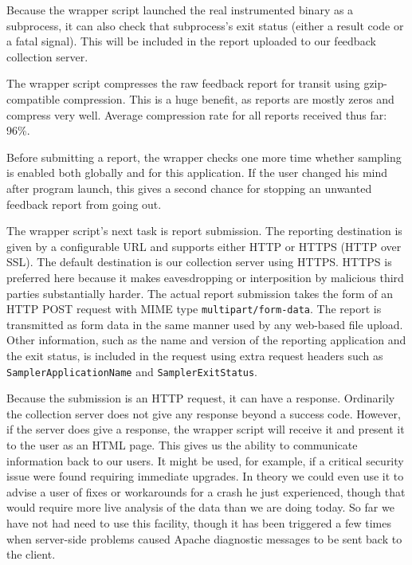 \documentclass[times,10pt,twocolumn]{article}
\begin{document}
Because the wrapper script launched the real instrumented binary as a
subprocess, it can also check that subprocess's exit status (either a
result code or a fatal signal).  This will be included in the report
uploaded to our feedback collection server.

The wrapper script compresses the raw feedback report for transit
using gzip-compatible compression.  This is a huge benefit, as reports
are mostly zeros and compress very well.  Average compression rate for
all reports received thus far: 96\%.

Before submitting a report, the wrapper checks one more time whether
sampling is enabled both globally and for this application.  If the
user changed his mind after program launch, this gives a second chance
for stopping an unwanted feedback report from going out.

The wrapper script's next task is report submission.  The reporting
destination is given by a configurable URL and supports either HTTP or
HTTPS (HTTP over SSL).  The default destination is our collection
server using HTTPS.  HTTPS is preferred here because it makes
eavesdropping or interposition by malicious third parties
substantially harder.  The actual report submission takes the form of
an HTTP POST request with MIME type \texttt{multipart/form-data}.  The
report is transmitted as form data in the same manner used by any
web-based file upload.  Other information, such as the name and
version of the reporting application and the exit status, is included
in the request using extra request headers such as
\texttt{SamplerApplicationName} and \texttt{SamplerExitStatus}.

Because the submission is an HTTP request, it can have a response.
Ordinarily the collection server does not give any response beyond a
success code.  However, if the server does give a response, the
wrapper script will receive it and present it to the user as an HTML
page.  This gives us the ability to communicate information back to
our users.  It might be used, for example, if a critical security
issue were found requiring immediate upgrades.  In theory we could
even use it to advise a user of fixes or workarounds for a crash he
just experienced, though that would require more live analysis of the
data than we are doing today.  So far we have not had need to use this
facility, though it has been triggered a few times when server-side
problems caused Apache diagnostic messages to be sent back to the
client.
\end{document}
